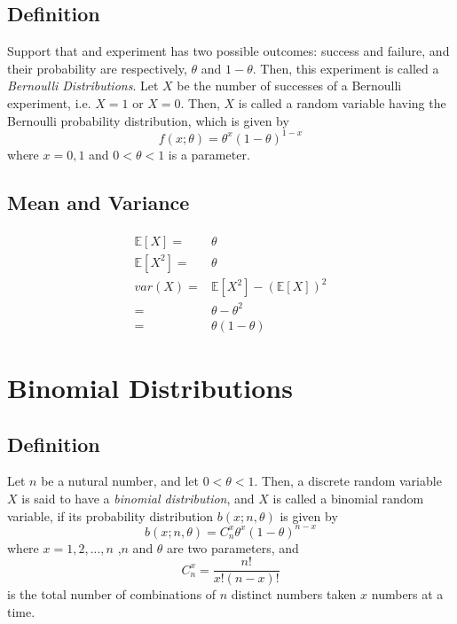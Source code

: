 \documentclass[titlepage]{article}
\begin{document}
        \subsection*{Definition}
            Support that and experiment has two possible outcomes: success and failure, and their probability are respectively, $\theta$ and $1-\theta$. Then, this experiment is called a \textit{Bernoulli Distributions}. Let $X$ be the number of successes of a Bernoulli experiment, i.e. $X=1$ or $X=0$. Then, $X$ is called a random variable having the Bernoulli probability distribution, which is given by
            $$f(x;\theta)=\theta^x(1-\theta)^{1-x}$$
            where $x=0,1$ and $0<\theta<1$ is a parameter.

        \subsection*{Mean and Variance}
            \paragraph{
                \begin{equation*}
                    \begin{split}
                        \mathbb{E}[X]=&\theta\\
                        \mathbb{E}[X^2]=&\theta\\
                        var(X)=&\mathbb{E}[X^2]-(\mathbb{E}[X])^2\\
                        =&\theta-\theta^2\\
                        =&\theta(1-\theta)
                    \end{split}
                \end{equation*}
            }
    \section{Binomial Distributions}
        \subsection*{Definition}
            Let $n$ be a nutural number, and let $0<\theta<1$. Then, a discrete random variable $X$ is said to have a \textit{binomial distribution}, and $X$ is called a binomial random variable, if its probability distribution $b(x;n,\theta)$ is given by
            $$b(x;n,\theta)=C_n^x\theta^x(1-\theta)^{n-x}$$
            where $x=1,2,...,n$ ,$n$ and $\theta$ are two parameters, and 
            $$C_n^x=\frac{n!}{x!(n-x)!}$$
            is the total number of combinations of $n$ distinct numbers taken $x$ numbers at a time.
\end{document}
